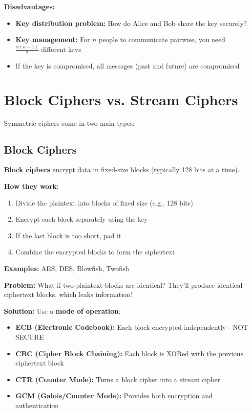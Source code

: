 \documentclass[11pt,a4paper]{report}
\begin{document}
\textbf{Disadvantages:}
\begin{itemize}
\item \textbf{Key distribution problem:} How do Alice and Bob share the key securely?
\item \textbf{Key management:} For $n$ people to communicate pairwise, you need $\frac{n(n-1)}{2}$ different keys
\item If the key is compromised, all messages (past and future) are compromised
\end{itemize}

\section{Block Ciphers vs. Stream Ciphers}

Symmetric ciphers come in two main types:

\subsection{Block Ciphers}

\textbf{Block ciphers} encrypt data in fixed-size blocks (typically 128 bits at a time).

\textbf{How they work:}
\begin{enumerate}
\item Divide the plaintext into blocks of fixed size (e.g., 128 bits)
\item Encrypt each block separately using the key
\item If the last block is too short, pad it
\item Combine the encrypted blocks to form the ciphertext
\end{enumerate}

\textbf{Examples:} AES, DES, Blowfish, Twofish

\textbf{Problem:} What if two plaintext blocks are identical? They'll produce identical ciphertext blocks, which leaks information!

\textbf{Solution:} Use a \textbf{mode of operation}:
\begin{itemize}
\item \textbf{ECB (Electronic Codebook):} Each block encrypted independently - NOT SECURE
\item \textbf{CBC (Cipher Block Chaining):} Each block is XORed with the previous ciphertext block
\item \textbf{CTR (Counter Mode):} Turns a block cipher into a stream cipher
\item \textbf{GCM (Galois/Counter Mode):} Provides both encryption and authentication
\end{itemize}
\end{document}
